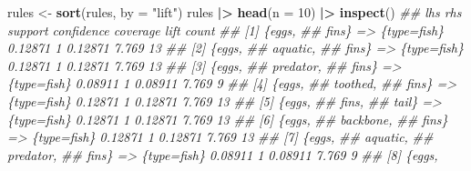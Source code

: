\documentclass[
  notitlepage]{book}
\newenvironment{Shaded}{\begin{snugshade}}{\end{snugshade}}
\newcommand{\CommentTok}[1]{\textcolor[rgb]{0.56,0.35,0.01}{\textit{#1}}}
\newcommand{\DataTypeTok}[1]{\textcolor[rgb]{0.13,0.29,0.53}{#1}}
\newcommand{\DecValTok}[1]{\textcolor[rgb]{0.00,0.00,0.81}{#1}}
\newcommand{\ErrorTok}[1]{\textcolor[rgb]{0.64,0.00,0.00}{\textbf{#1}}}
\newcommand{\KeywordTok}[1]{\textcolor[rgb]{0.13,0.29,0.53}{\textbf{#1}}}
\newcommand{\NormalTok}[1]{#1}
\newcommand{\OperatorTok}[1]{\textcolor[rgb]{0.81,0.36,0.00}{\textbf{#1}}}
\newcommand{\StringTok}[1]{\textcolor[rgb]{0.31,0.60,0.02}{#1}}
\begin{document}
\begin{Shaded}
\begin{Highlighting}[]
\NormalTok{rules \textless{}{-}}\StringTok{ }\KeywordTok{sort}\NormalTok{(rules, }\DataTypeTok{by =} \StringTok{"lift"}\NormalTok{)}
\NormalTok{rules }\OperatorTok{|}\ErrorTok{\textgreater{}}\StringTok{ }\KeywordTok{head}\NormalTok{(}\DataTypeTok{n =} \DecValTok{10}\NormalTok{) }\OperatorTok{|}\ErrorTok{\textgreater{}}\StringTok{ }\KeywordTok{inspect}\NormalTok{()}
\CommentTok{\#\#      lhs            rhs         support confidence coverage  lift count}
\CommentTok{\#\# [1]  \{eggs,                                                            }
\CommentTok{\#\#       fins\}      =\textgreater{} \{type=fish\} 0.12871          1  0.12871 7.769    13}
\CommentTok{\#\# [2]  \{eggs,                                                            }
\CommentTok{\#\#       aquatic,                                                         }
\CommentTok{\#\#       fins\}      =\textgreater{} \{type=fish\} 0.12871          1  0.12871 7.769    13}
\CommentTok{\#\# [3]  \{eggs,                                                            }
\CommentTok{\#\#       predator,                                                        }
\CommentTok{\#\#       fins\}      =\textgreater{} \{type=fish\} 0.08911          1  0.08911 7.769     9}
\CommentTok{\#\# [4]  \{eggs,                                                            }
\CommentTok{\#\#       toothed,                                                         }
\CommentTok{\#\#       fins\}      =\textgreater{} \{type=fish\} 0.12871          1  0.12871 7.769    13}
\CommentTok{\#\# [5]  \{eggs,                                                            }
\CommentTok{\#\#       fins,                                                            }
\CommentTok{\#\#       tail\}      =\textgreater{} \{type=fish\} 0.12871          1  0.12871 7.769    13}
\CommentTok{\#\# [6]  \{eggs,                                                            }
\CommentTok{\#\#       backbone,                                                        }
\CommentTok{\#\#       fins\}      =\textgreater{} \{type=fish\} 0.12871          1  0.12871 7.769    13}
\CommentTok{\#\# [7]  \{eggs,                                                            }
\CommentTok{\#\#       aquatic,                                                         }
\CommentTok{\#\#       predator,                                                        }
\CommentTok{\#\#       fins\}      =\textgreater{} \{type=fish\} 0.08911          1  0.08911 7.769     9}
\CommentTok{\#\# [8]  \{eggs,                                                            }

\end{Highlighting}
\end{Shaded}
\end{document}
